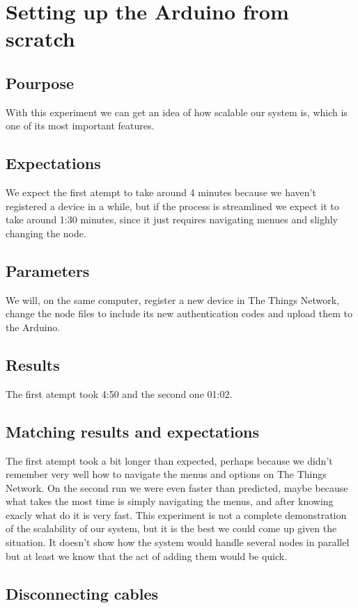 \section{Setting up the Arduino from scratch}

	\subsection{Pourpose}
		With this experiment we can get an idea of how scalable our system is, which is one of its most important features.
	\subsection{Expectations}
		We expect the first atempt to take around 4 minutes because we haven't registered a device in a while, but if the process is streamlined we expect it to take around 1:30 minutes, since it just requires navigating menues and slighly changing the node.
	\subsection{Parameters}
		We will, on the same computer, register a new device in The Things Network, change the node files to include its new authentication codes and upload them to the Arduino.
	\subsection{Results}
		The first atempt took 4:50 and the second one 01:02.
	\subsection{Matching results and expectations}
		The first atempt took a bit longer than expected, perhaps because we didn't remember very well how to navigate the menus and options on The Things Network. On the second run we were even faster than predicted, maybe because what takes the most time is simply navigating the menus, and after knowing exacly what do it is very fast. This experiment is not a complete demonstration of the scalability of our system, but it is the best we could come up given the situation. It doesn't show how the system would handle several nodes in parallel but at least we know that the act of adding them would be quick.

\subsection{Disconnecting cables}

